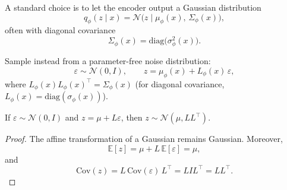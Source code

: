 \documentclass[../main]{subfiles}
\begin{document}
A standard choice is to let the encoder output a Gaussian distribution
\begin{equation}\label{eq:vae-encoder-gauss}
    q_\phi(z\mid x)=\mathcal N\!\bigl(z\mid \mu_\phi(x),\,\Sigma_\phi(x)\bigr),
\end{equation}
often with diagonal covariance
\begin{equation}
    \Sigma_\phi(x)=\mathrm{diag}\bigl(\sigma_\phi^2(x)\bigr).
\end{equation}

Sample instead from a parameter-free noise distribution:
\begin{equation}
    \varepsilon\sim \mathcal N(0,I),
    \qquad
    z=\mu_\phi(x) + L_\phi(x)\,\varepsilon,
\end{equation}
where $L_\phi(x)L_\phi(x)^\top=\Sigma_\phi(x)$ (for diagonal covariance,
$L_\phi(x)=\mathrm{diag}(\sigma_\phi(x))$).

\begin{proposition}\label{prop:vae-reparam}
If $\varepsilon\sim\mathcal N(0,I)$ and $z=\mu + L\varepsilon$, then
$z\sim\mathcal N(\mu,LL^\top)$.
\end{proposition}
\begin{proof}
The affine transformation of a Gaussian remains Gaussian.  
Moreover,
\begin{equation}
    \mathbb E[z]=\mu + L\,\mathbb E[\varepsilon]=\mu,
\end{equation}
and
\begin{equation}
    \mathrm{Cov}(z)
    =
    L\,\mathrm{Cov}(\varepsilon)\,L^\top
    =
    LIL^\top
    =
    LL^\top.
\end{equation}
\end{proof}
\end{document}
